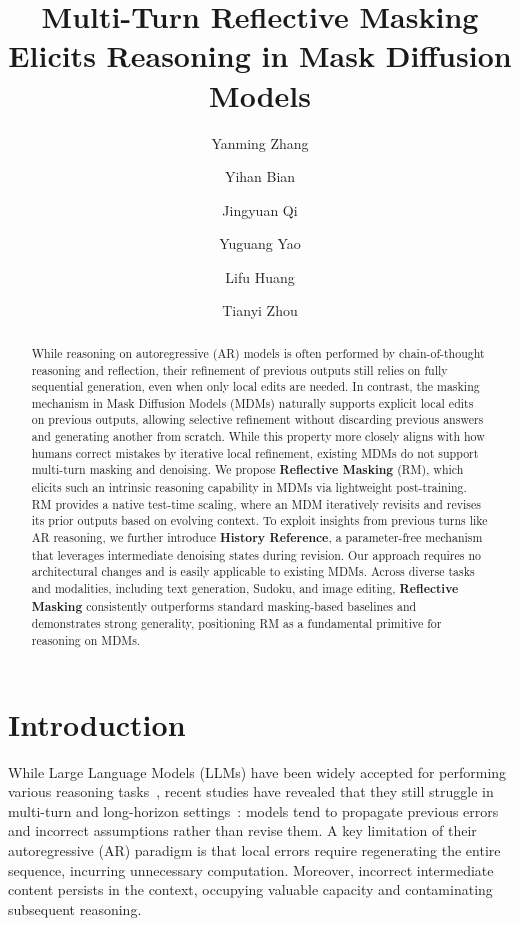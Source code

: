 \documentclass{llmxive}
\title{Multi-Turn Reflective Masking Elicits Reasoning in Mask Diffusion Models}
\author{Yanming Zhang \and Yihan Bian \and Jingyuan Qi \and Yuguang Yao \and Lifu Huang \and Tianyi Zhou}
\providecommand{\methodfull}{Reflective Masking\xspace}
\providecommand{\method}{RM\xspace}
\begin{document}
\maketitle
\begin{abstract}
While reasoning on autoregressive (AR) models is often performed by chain-of-thought reasoning and reflection, their refinement of previous outputs still relies on fully sequential generation, even when only local edits are needed. In contrast, the masking mechanism in Mask Diffusion Models (MDMs) naturally supports explicit local edits on previous outputs, allowing selective refinement without discarding previous answers and generating another from scratch. While this property more closely aligns with how humans correct mistakes by iterative local refinement, existing MDMs do not support multi-turn masking and denoising. We propose \textbf{\methodfull} (\method), which elicits such an intrinsic reasoning capability in MDMs via lightweight post-training. \method provides a native test-time scaling, where an MDM iteratively revisits and revises its prior outputs based on evolving context. To exploit insights from previous turns like AR reasoning, we further introduce \textbf{History Reference}, a parameter-free mechanism that leverages intermediate denoising states during revision. Our approach requires no architectural changes and is easily applicable to existing MDMs. Across diverse tasks and modalities, including text generation, Sudoku, and image editing, \textbf{\methodfull} consistently outperforms standard masking-based baselines and demonstrates strong generality, positioning \method as a fundamental primitive for reasoning on MDMs.
\end{abstract}
\section{Introduction}
\label{sec:introduction}


While Large Language Models (LLMs) have been widely accepted for performing various reasoning tasks~\citep{kojima2022large,wang2022self,lightman2023let,wei2022chain}, recent studies have revealed that they still struggle in multi-turn and long-horizon settings~\citep{laban2025llms}: models tend to propagate previous errors and incorrect assumptions rather than revise them. A key limitation of their autoregressive (AR) paradigm is that local errors require regenerating the entire sequence, incurring unnecessary computation. Moreover, incorrect intermediate content persists in the context, occupying valuable capacity and contaminating subsequent reasoning.
\end{document}
